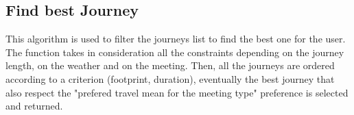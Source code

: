 

\subsection{Find best Journey}
This algorithm is used to filter the journeys list to find the best one for the user.
The function takes in consideration all the constraints depending on the journey length, on the weather and on the meeting.
Then, all the journeys are ordered according to a criterion (footprint, duration), eventually the best journey that also respect the "prefered travel mean for the meeting type" preference is selected and returned.


